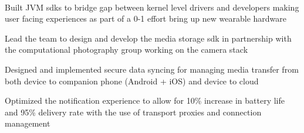 \documentclass[a4paper]{deedy-resume-openfont} %
\begin{document}
\begin{minipage}[t]{0.66\textwidth}
\\

\begin{tightitemize}
\item Built JVM sdks to bridge gap between kernel level drivers and developers making user facing experiences as part of a 0-1 effort bring up new wearable hardware
\item Lead the team to design and develop the media storage sdk in partnership with the computational photography group working on the camera stack
\item Designed and implemented secure data syncing for managing media transfer from both device to companion phone (Android + iOS) and device to cloud
\item Optimized the notification experience to allow for 10\% increase in battery life and 95\% delivery  rate with the use of transport proxies and connection management
\end{tightitemize}

\\

\sectionspace %

\\


\end{minipage}
\end{document}
